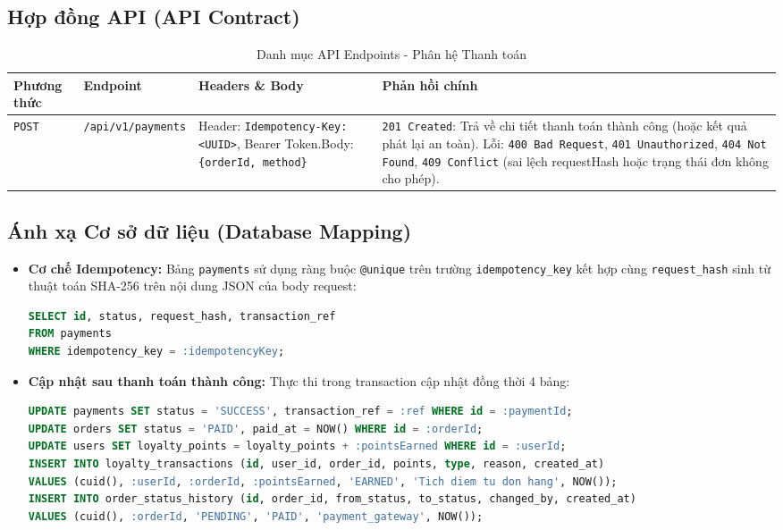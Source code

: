 \subsection{Hợp đồng API (API Contract)}
\begin{table}[htbp]
\centering
\small
\caption{Danh mục API Endpoints - Phân hệ Thanh toán}
\label{tab:api-payment}
\begin{tabularx}{\textwidth}{llp{4.5cm}X}
\toprule
\textbf{Phương thức} & \textbf{Endpoint} & \textbf{Headers \& Body} & \textbf{Phản hồi chính} \\
\midrule
\texttt{POST} & \texttt{/api/v1/payments} & 
Header: \texttt{Idempotency-Key: <UUID>}, Bearer Token.\newline Body: \texttt{\{orderId, method\}} & 
\texttt{201 Created}: Trả về chi tiết thanh toán thành công (hoặc kết quả phát lại an toàn). Lỗi: \texttt{400 Bad Request}, \texttt{401 Unauthorized}, \texttt{404 Not Found}, \texttt{409 Conflict} (sai lệch requestHash hoặc trạng thái đơn không cho phép). \\
\bottomrule
\end{tabularx}
\end{table}

\subsection{Ánh xạ Cơ sở dữ liệu (Database Mapping)}
\begin{itemize}
    \item \textbf{Cơ chế Idempotency:} Bảng \texttt{payments} sử dụng ràng buộc \texttt{@unique} trên trường \texttt{idempotency\_key} kết hợp cùng \texttt{request\_hash} sinh từ thuật toán SHA-256 trên nội dung JSON của body request:
    \begin{lstlisting}[language=SQL]
SELECT id, status, request_hash, transaction_ref 
FROM payments 
WHERE idempotency_key = :idempotencyKey;
    \end{lstlisting}
    \item \textbf{Cập nhật sau thanh toán thành công:} Thực thi trong transaction cập nhật đồng thời 4 bảng:
    \begin{lstlisting}[language=SQL]
UPDATE payments SET status = 'SUCCESS', transaction_ref = :ref WHERE id = :paymentId;
UPDATE orders SET status = 'PAID', paid_at = NOW() WHERE id = :orderId;
UPDATE users SET loyalty_points = loyalty_points + :pointsEarned WHERE id = :userId;
INSERT INTO loyalty_transactions (id, user_id, order_id, points, type, reason, created_at)
VALUES (cuid(), :userId, :orderId, :pointsEarned, 'EARNED', 'Tich diem tu don hang', NOW());
INSERT INTO order_status_history (id, order_id, from_status, to_status, changed_by, created_at)
VALUES (cuid(), :orderId, 'PENDING', 'PAID', 'payment_gateway', NOW());
    \end{lstlisting}
\end{itemize}

